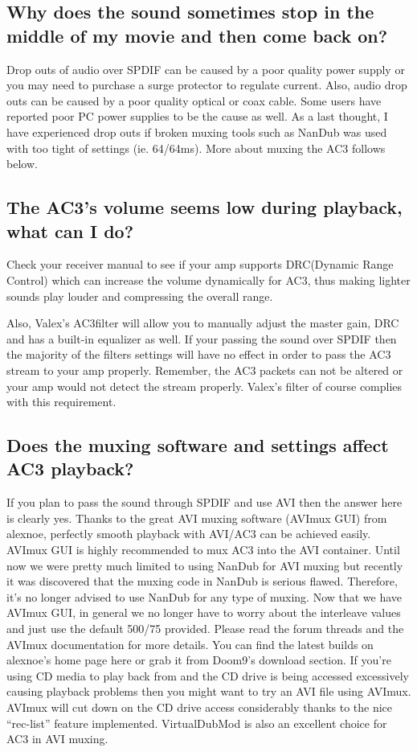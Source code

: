 ﻿\documentclass[12pt]{article}
\begin{document}
\subsection{Why does the sound sometimes stop in the middle of my movie and then come back on?}

Drop outs of audio over SPDIF can be caused by a poor quality power supply or you may need to
purchase a surge protector to regulate current. Also, audio drop outs can be caused by a poor
quality optical or coax cable. Some users have reported poor PC power supplies to be the cause as
well. As a last thought, I have experienced drop outs if broken muxing tools such as NanDub was used
with too tight of settings (ie. 64/64ms). More about muxing the AC3 follows below.

\subsection{The AC3's volume seems low during playback, what can I do?}

Check your receiver manual to see if your amp supports DRC(Dynamic Range Control) which can increase
the volume dynamically for AC3, thus making lighter sounds play louder and compressing the overall
range.

Also, Valex's AC3filter will allow you to manually adjust the master gain, DRC and has a built-in
equalizer as well. If your passing the sound over SPDIF then the majority of the filters settings
will have no effect in order to pass the AC3 stream to your amp properly. Remember, the AC3 packets
can not be altered or your amp would not detect the stream properly. Valex's filter of course
complies with this requirement.

\subsection{Does the muxing software and settings affect AC3 playback?}

If you plan to pass the sound through SPDIF and use AVI then the answer here is clearly yes. Thanks
to the great AVI muxing software (AVImux GUI) from alexnoe, perfectly smooth playback with AVI/AC3
can be achieved easily. AVImux GUI is highly recommended to mux AC3 into the AVI container. Until
now we were pretty much limited to using NanDub for AVI muxing but recently it was discovered that
the muxing code in NanDub is serious flawed. Therefore, it's no longer advised to use NanDub for any
type of muxing. Now that we have AVImux GUI, in general we no longer have to worry about the
interleave values and just use the default 500/75 provided. Please read the forum threads and the
AVImux documentation for more details. You can find the latest builds on alexnoe's home page here or
grab it from Doom9's download section. If you're using CD media to play back from and the CD drive
is being accessed excessively causing playback problems then you might want to try an AVI file using
AVImux. AVImux will cut down on the CD drive access considerably thanks to the nice ``rec-list''
feature implemented. VirtualDubMod is also an excellent choice for AC3 in AVI muxing.
\end{document}
